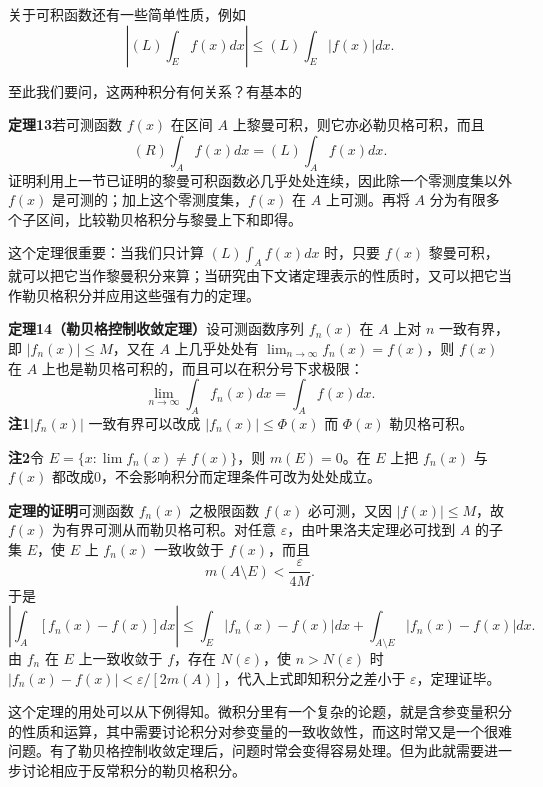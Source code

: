 关于可积函数还有一些简单性质，例如
\[
\left|(L)\int_Ef(x)dx\right|\le(L)\int_E|f(x)|dx. \tag{36}
\]

至此我们要问，这两种积分有何关系？有基本的

\noindent\textbf{定理13}\quad 若可测函数 $f(x)$ 在区间 $A$ 上黎曼可积，则它亦必勒贝格可积，而且
\[
(R)\int_Af(x)dx=(L)\int_Af(x)dx. \tag{37}
\]
证明利用上一节已证明的黎曼可积函数必几乎处处连续，因此除一个零测度集以外 $f(x)$ 是可测的；加上这个零测度集，$f(x)$ 在 $A$ 上可测。再将 $A$ 分为有限多个子区间，比较勒贝格积分与黎曼上下和即得。

这个定理很重要：当我们只计算 $(L)\int_Af(x)dx$ 时，只要 $f(x)$ 黎曼可积，就可以把它当作黎曼积分来算；当研究由下文诸定理表示的性质时，又可以把它当作勒贝格积分并应用这些强有力的定理。

\noindent\textbf{定理14（勒贝格控制收敛定理）}\quad 设可测函数序列 $f_n(x)$ 在 $A$ 上对 $n$ 一致有界，即 $|f_n(x)|\le M$，又在 $A$ 上几乎处处有 $\lim_{n\to\infty}f_n(x)=f(x)$，则 $f(x)$ 在 $A$ 上也是勒贝格可积的，而且可以在积分号下求极限：
\[
\lim_{n\to\infty}\int_Af_n(x)dx=\int_Af(x)dx. \tag{38}
\]
\textbf{注1}\quad $|f_n(x)|$ 一致有界可以改成 $|f_n(x)|\le\Phi(x)$ 而 $\Phi(x)$ 勒贝格可积。

\textbf{注2}\quad 令 $E=\{x:\lim f_n(x)\ne f(x)\}$，则 $m(E)=0$。在 $E$ 上把 $f_n(x)$ 与 $f(x)$ 都改成0，不会影响积分而定理条件可改为处处成立。

\noindent\textbf{定理的证明}\quad 可测函数 $f_n(x)$ 之极限函数 $f(x)$ 必可测，又因 $|f(x)|\le M$，故 $f(x)$ 为有界可测从而勒贝格可积。对任意 $\varepsilon$，由叶果洛夫定理必可找到 $A$ 的子集 $E$，使 $E$ 上 $f_n(x)$ 一致收敛于 $f(x)$，而且
\[
m(A\setminus E)<\frac{\varepsilon}{4M}.
\]
于是
\[
\left|\int_A[f_n(x)-f(x)]dx\right|
\le \int_E|f_n(x)-f(x)|dx+\int_{A\setminus E}|f_n(x)-f(x)|dx.
\]
由 $f_n$ 在 $E$ 上一致收敛于 $f$，存在 $N(\varepsilon)$，使 $n>N(\varepsilon)$ 时 $|f_n(x)-f(x)|<\varepsilon/[2m(A)]$，代入上式即知积分之差小于 $\varepsilon$，定理证毕。

这个定理的用处可以从下例得知。微积分里有一个复杂的论题，就是含参变量积分的性质和运算，其中需要讨论积分对参变量的一致收敛性，而这时常又是一个很难问题。有了勒贝格控制收敛定理后，问题时常会变得容易处理。但为此就需要进一步讨论相应于反常积分的勒贝格积分。
